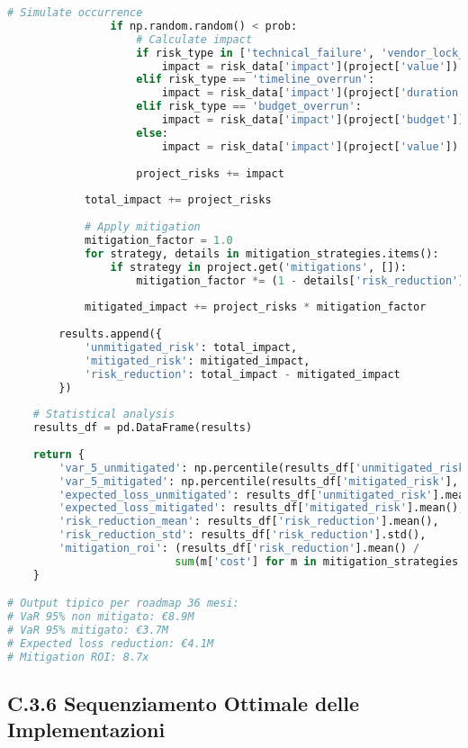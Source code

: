 \begin{lstlisting}[language=Python, caption=Analisi Monte Carlo del Rischio di Trasformazione]
                # Simulate occurrence
                if np.random.random() < prob:
                    # Calculate impact
                    if risk_type in ['technical_failure', 'vendor_lock_in', 'security_breach']:
                        impact = risk_data['impact'](project['value'])
                    elif risk_type == 'timeline_overrun':
                        impact = risk_data['impact'](project['duration'])
                    elif risk_type == 'budget_overrun':
                        impact = risk_data['impact'](project['budget'])
                    else:
                        impact = risk_data['impact'](project['value'])
                    
                    project_risks += impact
            
            total_impact += project_risks
            
            # Apply mitigation
            mitigation_factor = 1.0
            for strategy, details in mitigation_strategies.items():
                if strategy in project.get('mitigations', []):
                    mitigation_factor *= (1 - details['risk_reduction'])
            
            mitigated_impact += project_risks * mitigation_factor
        
        results.append({
            'unmitigated_risk': total_impact,
            'mitigated_risk': mitigated_impact,
            'risk_reduction': total_impact - mitigated_impact
        })
    
    # Statistical analysis
    results_df = pd.DataFrame(results)
    
    return {
        'var_5_unmitigated': np.percentile(results_df['unmitigated_risk'], 95),
        'var_5_mitigated': np.percentile(results_df['mitigated_risk'], 95),
        'expected_loss_unmitigated': results_df['unmitigated_risk'].mean(),
        'expected_loss_mitigated': results_df['mitigated_risk'].mean(),
        'risk_reduction_mean': results_df['risk_reduction'].mean(),
        'risk_reduction_std': results_df['risk_reduction'].std(),
        'mitigation_roi': (results_df['risk_reduction'].mean() / 
                          sum(m['cost'] for m in mitigation_strategies.values()))
    }

# Output tipico per roadmap 36 mesi:
# VaR 95% non mitigato: €8.9M
# VaR 95% mitigato: €3.7M
# Expected loss reduction: €4.1M
# Mitigation ROI: 8.7x
\end{lstlisting}

\subsection{\texorpdfstring{\textbf{C.3.6 Sequenziamento Ottimale delle Implementazioni}}{C.3.6 - Sequenziamento Ottimale delle Implementazioni}}

